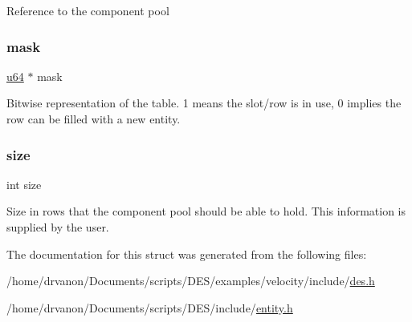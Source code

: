 Reference to the component pool \mbox{\label{struct_meta_component_pool_a98ab08080a9542a53fd11e192635d257}} 
\subsubsection{\texorpdfstring{mask}{mask}}
{\footnotesize\ttfamily \mbox{\hyperlink{examples_2velocity_2include_2des__internal_8h_a3f7e2bcbb0b4c338f3c4f6c937cd4234}{u64}} $\ast$ mask}

Bitwise representation of the table. 1 means the slot/row is in use, 0 implies the row can be filled with a new entity. \mbox{\label{struct_meta_component_pool_a439227feff9d7f55384e8780cfc2eb82}} 
\subsubsection{\texorpdfstring{size}{size}}
{\footnotesize\ttfamily int size}

Size in rows that the component pool should be able to hold. This information is supplied by the user. 

The documentation for this struct was generated from the following files\+:\begin{DoxyCompactItemize}
\item 
/home/drvanon/\+Documents/scripts/\+D\+E\+S/examples/velocity/include/\mbox{\hyperlink{examples_2velocity_2include_2des_8h}{des.\+h}}\item 
/home/drvanon/\+Documents/scripts/\+D\+E\+S/include/\mbox{\hyperlink{entity_8h}{entity.\+h}}\end{DoxyCompactItemize}

